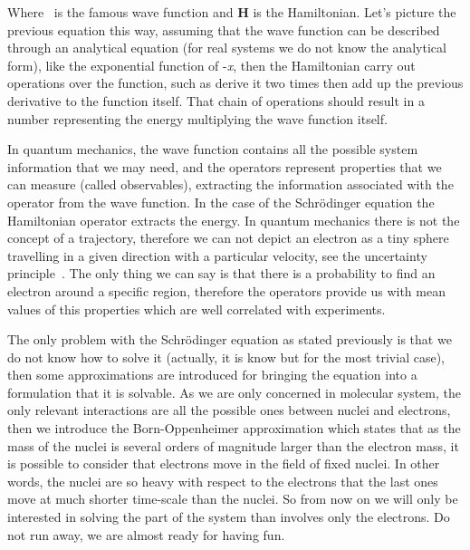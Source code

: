 \documentclass{tmr}
\begin{document}
Where \textPsi\ is the famous wave function and \textbf{H} is the Hamiltonian. 
Let's picture the previous equation this way, assuming that the wave function 
can be described through an analytical equation (for real systems we do not know the analytical form),
like the exponential function of -\textit{\textalpha x},
then the Hamiltonian carry out operations over the function, such as derive it two times 
then add up the previous derivative to the function itself.
That chain of operations should result in a number representing the energy
multiplying the wave function itself.
\par In quantum mechanics, the wave function contains all the possible system information that 
we may need, and the operators represent properties that we can measure (called observables),
extracting the information associated with the operator from the wave function.
In the case of the Schr\"odinger equation the Hamiltonian operator extracts the energy. 
In quantum mechanics there is not the concept of a trajectory, therefore we can not depict an electron
as a tiny sphere travelling in a given direction with a particular velocity,
see the uncertainty principle~\cite{uncertainty}. The only thing
we can say is that there is a probability to find an electron
around a specific region, therefore the operators provide us with mean values of this properties which are
well correlated with experiments. 

\par The only problem with the Schr\"odinger equation as stated previously
is that we do not know how to solve it 
(actually, it is know but for the most trivial case),
then some approximations are introduced for bringing the equation into 
a formulation that it is solvable. As we are only concerned
in molecular system, the only relevant interactions are all the possible ones
between nuclei and electrons, then we
introduce the Born-Oppenheimer approximation which states that as the mass of the nuclei is several 
orders of magnitude larger than the electron mass, it is possible to consider that electrons move in the 
field of fixed nuclei. In other words, the nuclei are so heavy with respect to the electrons that the last ones move 
at much shorter time-scale than the nuclei. So from now on we will only be interested in solving 
the part of the system than involves only the electrons. Do not run away, we are almost ready for having fun.
\end{document}
